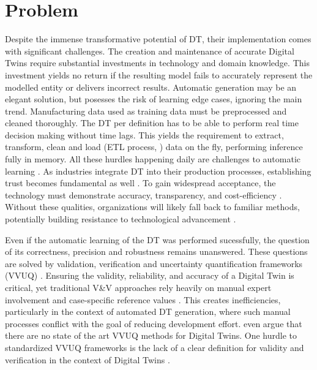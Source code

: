 \section{Problem}
Despite the immense transformative potential of DT, their implementation comes with significant challenges. The creation and maintenance of accurate Digital Twins require substantial investments in technology and domain knowledge. This investment yields no return if the resulting model fails to accurately represent the modelled entity or delivers incorrect results. Automatic generation may be an elegant solution, but posesses the risk of learning edge cases, ignoring the main trend. Manufacturing data used as training data must be preprocessed and cleaned thoroughly. The DT per definition has to be able to perform real time decision making without time lags. This yields the requirement to extract, transform, clean and load (ETL process, \cite{vassiliadis2002conceptual}) data on the fly, performing inference fully in memory. All these hurdles happening daily are challenges to automatic learning \parencite{ribeiro2016should,zhao2024data}. As industries integrate DT into their production processes, establishing trust becomes fundamental as well \parencite{trauer2022digital,arrieta2020explainable}. To gain widespread acceptance, the technology must demonstrate accuracy, transparency, and cost-efficiency \parencite{Wright2020amse,Shao2023mfglet}. Without these qualities, organizations will likely fall back to familiar methods, potentially building resistance to technological advancement \parencite{lapointe2005multilevel}.

Even if the automatic learning of the DT was performed sucessfully, the question of its correctness, precision and robustness remains unanswered. These questions are solved by validation, verification and uncertainty quantification frameworks (VVUQ) \parencite{sel2025survey}. Ensuring the validity, reliability, and accuracy of a Digital Twin is critical, yet traditional V&V approaches rely heavily on manual expert involvement and case-specific reference values \parencite{Bitencourt2023,hua2022validation}. This creates inefficiencies, particularly in the context of automated DT generation, where such manual processes conflict with the goal of reducing development effort. \cite{hua2022validation} even argue that there are no state of the art VVUQ methods for Digital Twins. One hurdle to standardized VVUQ frameworks is the lack of a clear definition for validity and verification in the context of Digital Twins \parencite{Bitencourt2023}.

